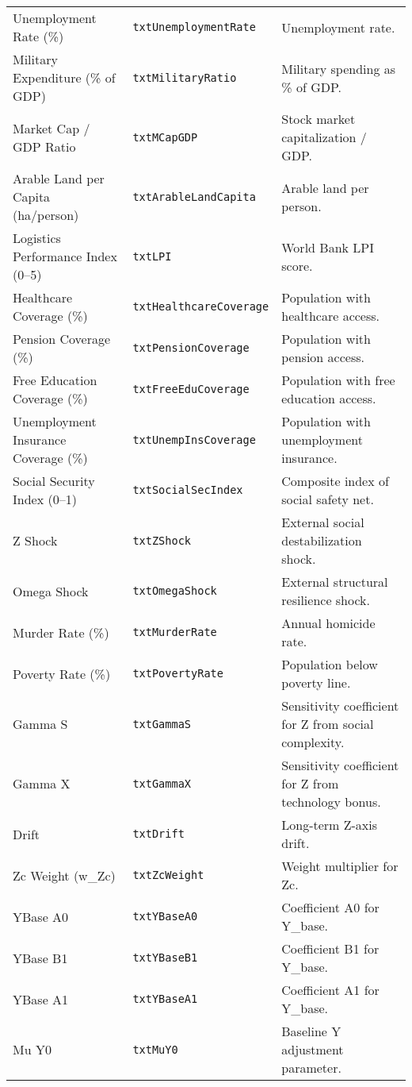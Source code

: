 \documentclass[12pt,a4paper]{article}
\begin{document}
\begin{longtable}{p{4cm} p{4cm} p{7cm}}
Unemployment Rate (\%) & \texttt{txtUnemploymentRate} & Unemployment rate. \\
Military Expenditure (\% of GDP) & \texttt{txtMilitaryRatio} & Military spending as \% of GDP. \\
Market Cap / GDP Ratio & \texttt{txtMCapGDP} & Stock market capitalization / GDP. \\
Arable Land per Capita (ha/person) & \texttt{txtArableLandCapita} & Arable land per person. \\
Logistics Performance Index (0–5) & \texttt{txtLPI} & World Bank LPI score. \\
Healthcare Coverage (\%) & \texttt{txtHealthcareCoverage} & Population with healthcare access. \\
Pension Coverage (\%) & \texttt{txtPensionCoverage} & Population with pension access. \\
Free Education Coverage (\%) & \texttt{txtFreeEduCoverage} & Population with free education access. \\
Unemployment Insurance Coverage (\%) & \texttt{txtUnempInsCoverage} & Population with unemployment insurance. \\
Social Security Index (0–1) & \texttt{txtSocialSecIndex} & Composite index of social safety net. \\
Z Shock & \texttt{txtZShock} & External social destabilization shock. \\
Omega Shock & \texttt{txtOmegaShock} & External structural resilience shock. \\
Murder Rate (\%) & \texttt{txtMurderRate} & Annual homicide rate. \\
Poverty Rate (\%) & \texttt{txtPovertyRate} & Population below poverty line. \\
Gamma S & \texttt{txtGammaS} & Sensitivity coefficient for Z from social complexity. \\
Gamma X & \texttt{txtGammaX} & Sensitivity coefficient for Z from technology bonus. \\
Drift & \texttt{txtDrift} & Long-term Z-axis drift. \\
Zc Weight (w\_Zc) & \texttt{txtZcWeight} & Weight multiplier for Zc. \\
YBase A0 & \texttt{txtYBaseA0} & Coefficient A0 for Y\_base. \\
YBase B1 & \texttt{txtYBaseB1} & Coefficient B1 for Y\_base. \\
YBase A1 & \texttt{txtYBaseA1} & Coefficient A1 for Y\_base. \\
Mu Y0 & \texttt{txtMuY0} & Baseline Y adjustment parameter. \\

\end{longtable}
\end{document}
